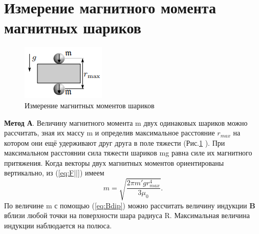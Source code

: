 \section{Измерение магнитного момента магнитных шариков}
\begin{figure}
    \includegraphics[width=\linewidth]{methodA.png}
    \caption{Измерение магнитных моментов шариков}
    \label{fig:methodA}
\end{figure}
\textbf{Метод А}.
Величину магнитного момента m двух
одинаковых шариков можно рассчитать, зная их
массу m и определив максимальное расстояние $r_{max}$
на котором они ещё удерживают друг друга в поле
тяжести (Рис.\ref{fig:methodA} ). При максимальном расстоянии
сила тяжести шариков mg равна силе их магнитного
притяжения.
Когда векторы двух магнитных моментов ориентированы вертикально, из (\ref{eq:F||}) имеем
\begin{equation}
    m=\sqrt{\frac{2\pi m'gr^4_{max}}{3\mu_0}}.
    \label{eq:mA}
\end{equation}
По величине m с помощью (\ref{eq:Bdip}) можно рассчитать величину индукции \textbf{B} вблизи любой точки на поверхности шара радиуса R. Максимальная величина индукции наблюдается на полюса.

